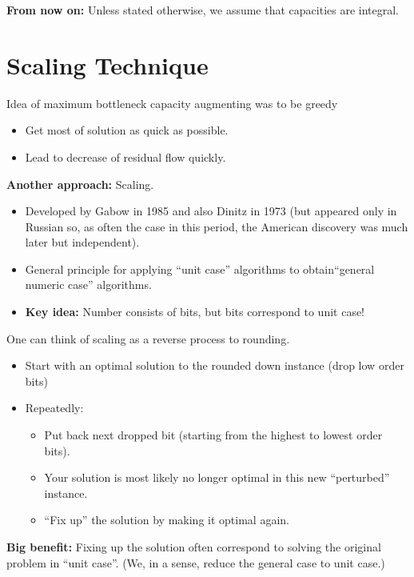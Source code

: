 \documentclass{article}
\begin{document}
\textbf{From now on:} Unless stated otherwise, we assume that capacities are integral.  	%


\section{Scaling Technique} %

Idea of maximum bottleneck capacity augmenting was to be greedy
\begin{itemize}
\item Get most of solution as quick as possible.
\item Lead to decrease of residual flow quickly.
\end{itemize}

{\bf Another approach:} Scaling. 
\begin{itemize}
\item Developed by Gabow in 1985 and also Dinitz in 1973 (but appeared only in Russian so, as
often the case in this period, the American discovery was much later but independent).
\item General principle for applying ``unit case'' algorithms to obtain``general numeric
case'' algorithms.
\item \textbf{Key idea:} Number consists of bits, but bits correspond to unit case!
\end{itemize}

One can think of scaling as a reverse process to rounding.
\begin{itemize}
\item Start with an optimal solution to the rounded down instance (drop low order bits)
\item Repeatedly: 
\begin{itemize}
\item Put back next dropped bit (starting from the highest to lowest order bits).
\item Your solution is most likely no longer optimal in this new ``perturbed'' instance.
\item ``Fix up'' the solution by making it optimal again.
\end{itemize}
\end{itemize}

\textbf{Big benefit:} Fixing up the solution often correspond to solving the original problem in ``unit case''.  (We, in a sense, reduce the general case to unit case.)
\end{document}
